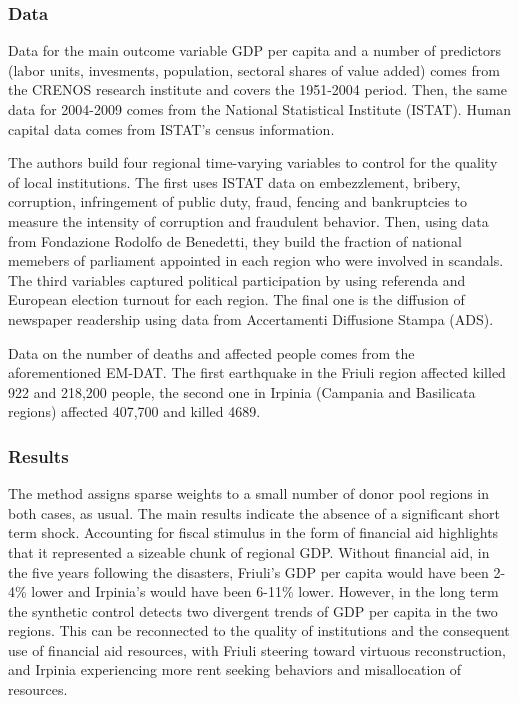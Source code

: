 \documentclass[12pt,a4paper,draft]{article}
\begin{document}
\subsubsection*{Data}
Data for the main outcome variable GDP per capita and a number of predictors (labor 
units, invesments, population, sectoral shares of value added) comes 
from the CRENOS research institute and covers the 1951-2004 period. Then, the same data for 
2004-2009 comes from the National Statistical Institute (ISTAT). Human capital data comes from 
ISTAT's census information.

The authors build four regional time-varying variables to control for the quality of 
local institutions. The first uses ISTAT data on embezzlement, bribery, corruption, infringement 
of public duty, fraud, fencing and bankruptcies to measure the intensity of corruption and 
fraudulent behavior. Then, using data from Fondazione Rodolfo de Benedetti, they build the fraction 
of national memebers of parliament appointed in each region who were involved in scandals. 
The third variables captured political participation by using referenda and European election 
turnout for each region. The final one is the diffusion of newspaper readership using data 
from Accertamenti Diffusione Stampa (ADS).

Data on the number of deaths and affected people comes from the aforementioned EM-DAT. The 
first earthquake in the Friuli region affected killed 922 and 218,200 people, the second one 
in Irpinia (Campania and Basilicata regions) affected 407,700 and killed 4689.

\subsubsection*{Results}
The method assigns sparse weights to a small number of donor pool regions in both cases, as usual.
The main results indicate the absence of a significant short term shock. 
Accounting for fiscal stimulus in the form of financial aid highlights that it 
represented a sizeable chunk of regional GDP.
Without financial aid, in the five years following the disasters, Friuli's GDP per capita would 
have been 2-4\% lower and Irpinia's would have been 6-11\% lower. 
However, in the long term the synthetic 
control detects two divergent trends of GDP per capita in the two regions. 
This can be reconnected to 
the quality of institutions and the consequent use of financial aid resources, with Friuli steering 
toward virtuous reconstruction, and Irpinia experiencing more rent seeking behaviors and misallocation 
of resources.  
\end{document}
